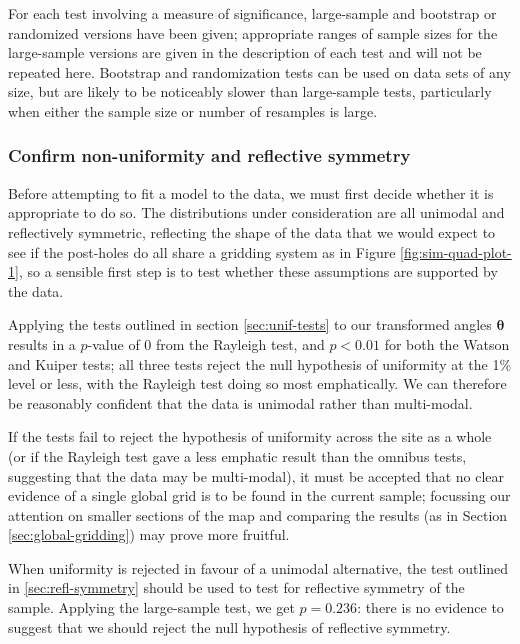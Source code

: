 \documentclass[../../ArchStats.tex]{subfiles}
\begin{document}
For each test involving a measure of significance, large-sample and bootstrap or randomized versions have been given; appropriate ranges of sample sizes for the large-sample versions are given in the description of each test and will not be repeated here. Bootstrap and randomization tests can be used on data sets of any size, but are likely to be noticeably slower than large-sample tests, particularly when either the sample size or number of resamples is large. 


\subsubsection{Confirm non-uniformity and reflective symmetry}
\label{sssec:unif-test}
Before attempting to fit a model to the data, we must first decide whether it is appropriate to do so. The distributions under consideration are all unimodal and reflectively symmetric, reflecting the shape of the data that we would expect to see if the post-holes do all share a gridding system as in Figure \ref{fig:sim-quad-plot-1}, so a sensible first step is to test whether these assumptions are supported by the data. 

Applying the tests outlined in section \ref{sec:unif-tests} to our transformed angles $\boldsymbol{\theta}$ results in a $p$-value of 0 from the Rayleigh test, and $p < 0.01$ for both the Watson and Kuiper tests; all three tests reject the null hypothesis of uniformity at the 1\% level or less, with the Rayleigh test doing so most emphatically. We can therefore be reasonably confident that the data is unimodal rather than multi-modal.

If the tests fail to reject the hypothesis of uniformity across the site as a whole (or if the Rayleigh test gave a less emphatic result than the omnibus tests, suggesting that the data may be multi-modal), it must be accepted that no clear evidence of a single global grid is to be found in the current sample; focussing our attention on smaller sections of the map and comparing the results (as in Section \ref{sec:global-gridding}) may prove more fruitful. 

When uniformity is rejected in favour of a unimodal alternative, the test outlined in \ref{sec:refl-symmetry} should be used to test for reflective symmetry of the sample. 
Applying the large-sample test, we get $p = 0.236$: there is no evidence to suggest that we should reject the null hypothesis of reflective symmetry.
\end{document}
